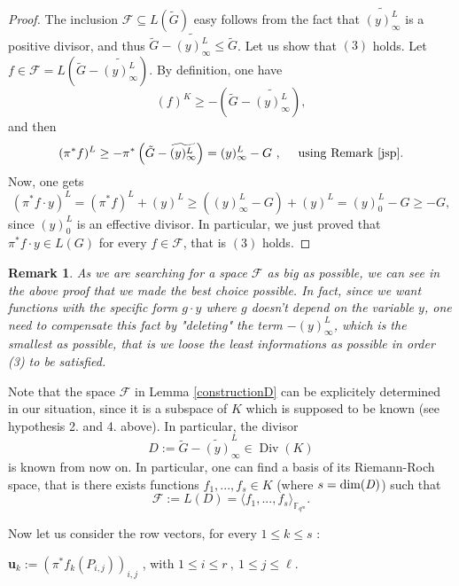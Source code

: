 \documentclass[10pt]{article}
\newtheorem{rq1}[thm]{Remark}
\newcommand{\s}{\vspace{0.3cm}}
\newcommand{\cd}{\cdot}
\newcommand{\fqm}{\mathbb{F}_{q^m}}
\newcommand{\su}{\subseteq}
\newcommand{\Div}{\operatorname{Div}}
\begin{document}
\s

\begin{proof}
The inclusion $\mathcal{F} \su L(\tilde{G})$ easy follows from the fact that $\widetilde{(y)^L_{\infty}}$ is a positive divisor, and thus $\tilde{G}-\widetilde{(y)^L_{\infty}} \leq \tilde{G}$. Let us show that $(3)$ holds. Let $f \in \mathcal{F} =  L\left(\tilde{G}-\widetilde{(y)^L_{\infty}}\right)$. By definition, one have 
\[(f)^K \geq -\left(\tilde{G}-\widetilde{(y)^L_{\infty}}\right),\]
and then 
\[(\pi^*f)^L \geq -\pi^*\left(\tilde{G}-\widetilde{(y)^L_{\infty}}\right) = (y)^L_{\infty} - G \ , \ \quad \rm using \ Remark \  \ref{jsp}.\]
Now, one gets 
\[(\pi^*f \cd y)^L = (\pi^*f)^L  + (y)^L \geq  ((y)^L_{\infty} - G)+(y)^L = (y)^L_0 - G \geq -G,\]
since $(y)^L_0$ is an effective divisor. In particular, we just proved that $\pi^*f \cd y \in L(G)$ for every $f \in \mathcal{F}$, that is $(3)$ holds.
\end{proof}

\s

\begin{rq1} \rm \label{remark5}
As we are searching for a space $\mathcal{F}$ as big as possible, we can see in the above proof that we made the best choice possible. In fact, since we want functions with the specific form $g \cd y$ where $g$ doesn't depend on the variable $y$, one need to compensate this fact by "deleting" the term $-(y)^L_{\infty}$, which is the smallest as possible, that is we loose the least informations as possible in order (3) to be satisfied.
\end{rq1}

\s

Note that the space $\mathcal{F}$ in Lemma \ref{constructionD} can be explicitely determined in our situation, since it is a subspace of $K$ which is supposed to be known (see hypothesis 2. and 4. above). In particular, the divisor 
\begin{equation}
D := \tilde{G} - \widetilde{(y)}^L_{\infty} \in \Div(K)
\end{equation}
is known from now on. In particular, one can find a basis of its Riemann-Roch space, that is there exists functions $f_1,...,f_s \in K$ (where $s=\rm dim(\it D)$) such that 
\[\mathcal{F} := L(D) = \langle f_1,...,f_s \rangle_{\fqm}.\]

Now let us consider the row vectors, for every $1 \leq k \leq s$ :
\begin{center}
\textbf{u}$_{k}:= \left(\pi^*f_k(P_{i,j})\right)_{i,j}$ , with $1 \leq i \leq r \ , \ 1 \leq j \leq \ell$.
\end{center}
\end{document}
